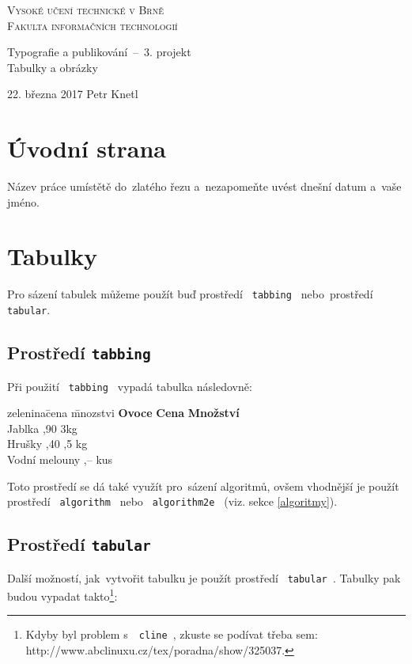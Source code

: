 \documentclass[a4paper, 11pt]{article}
\begin{document}
\begin{center} 
\Huge
\textsc{Vysoké učení
technické v Brně\\ \huge Fakulta informačních technologií}\\

\LARGE Typografie a publikování \,--\, 3. projekt\\
\Huge Tabulky a obrázky
\end{center}
{\Large 22. března 2017 \hfill
Petr Knetl}
\newpage
{}
\section{Úvodní strana}
Název práce umístětě do~zlatého řezu a~nezapomeňte uvést dnešní datum a~vaše jméno.
\section{Tabulky}
Pro sázení tabulek můžeme použít buď prostředí \texttt{ tabbing } nebo~prostředí \texttt{ tabular}.
\subsection{Prostředí \texttt{tabbing}}
Při použití \texttt{ tabbing } vypadá tabulka následovně:
 
\begin{tabbing}
zelenina\qquad \qquad \= cena \quad \= mnozstvi \kill
\textbf{Ovoce} \> \textbf{Cena} \> \textbf{Množství} \\
Jablka ,90 \> 3kg \\
Hrušky ,40 ,5 kg \\
Vodní melouny ,{--}  kus  \\
\end{tabbing}

\noindent Toto prostředí se dá také využít pro~sázení algoritmů, ovšem vhodnější je použít prostředí \texttt{ algorithm } nebo \texttt{ algorithm2e } (viz. sekce \ref{algoritmy}).

\subsection{Prostředí \texttt{tabular}}
Další možností, jak~vytvořit tabulku  je použít prostředí \texttt{ tabular }. Tabulky pak budou vypadat takto\footnote{Kdyby byl problem s~\texttt{ cline }, zkuste se podívat třeba sem: 
http://www.abclinuxu.cz/tex/poradna/show/325037.}:
\end{document}
